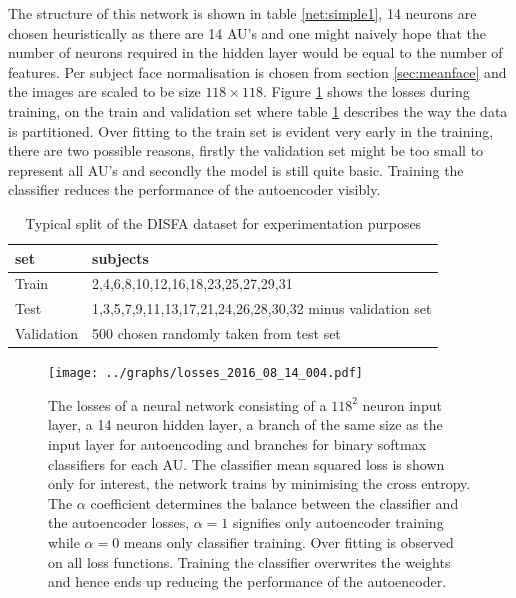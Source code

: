     The structure of this network is shown in table \ref{net:simple1}, 14 neurons
    are chosen heuristically as there are 14 AU's and one might naively hope that the number of
    neurons required in the hidden layer would be equal to the number of features. Per subject face normalisation
    is chosen from section \ref{sec:meanface} and the images are scaled to be size $118 \times 118$.
    Figure \ref{fig:simple} shows the losses during training, on the train and validation set where table \ref{tab:splitting}
    describes the way the data is partitioned. Over fitting to the train set is evident very early in the training, there are two
    possible reasons, firstly the validation set might be too small to represent all AU's and secondly the model is still quite basic.
    Training the classifier reduces the performance of the autoencoder visibly.

    \begin{table}[h!]
      \centering
      {\footnotesize
      \begin{tabular}{|l|l|}
      \hline
      set & subjects   \\
      \hline
       Train          & 2,4,6,8,10,12,16,18,23,25,27,29,31      \\
      \hline
      Test      & 1,3,5,7,9,11,13,17,21,24,26,28,30,32 minus validation set     \\
      \hline
      Validation           & 500 chosen randomly taken from test set      \\
     \hline
      \end{tabular}
      \caption{Typical split of the DISFA dataset for experimentation purposes}
      \label{tab:splitting}  }
    \end{table}


    \begin{figure}[!h]
    \centering
    \texttt{[image: ../graphs/losses\_2016\_08\_14\_004.pdf]}
    \caption{The losses of a neural network consisting of a $118^2$ neuron input layer, a 14
    neuron hidden layer, a branch of the same size as the input layer for autoencoding
    and branches for binary softmax classifiers for each AU. The classifier mean
    squared loss is shown only for interest, the network trains by minimising
    the cross entropy. The $\alpha$ coefficient determines the balance between the
    classifier and the autoencoder losses, $\alpha=1$ signifies only autoencoder training
    while $\alpha=0$ means only classifier training. Over fitting is observed
    on all loss functions. Training the classifier
    overwrites the weights and hence ends up reducing
    the performance of the autoencoder.}
    \label{fig:simple}
    \end{figure}


